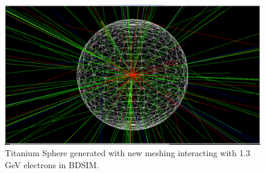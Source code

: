 \documentclass[12pt,a4paper]{article}
\begin{document}
\begin{figure}[h!]
\centering
\includegraphics[scale=0.33]{Images//BDSIM//titanium.pdf}
\caption[width=\columnwidth]{Titanium Sphere generated with new meshing interacting with 1.3 GeV electrons in BDSIM.}
\label{black}
\end{figure}
\end{document}
